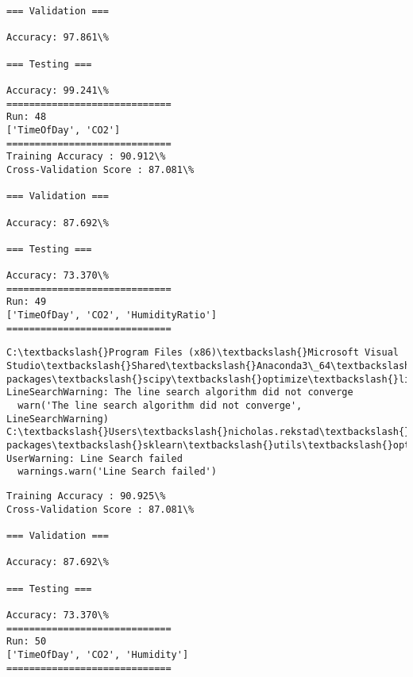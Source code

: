 \documentclass[11pt]{article}
\begin{document}
\begin{Verbatim}[commandchars=\\\{\}]
=== Validation ===

Accuracy: 97.861\%

=== Testing ===

Accuracy: 99.241\%
=============================
Run: 48
['TimeOfDay', 'CO2']
=============================
Training Accuracy : 90.912\%
Cross-Validation Score : 87.081\%

=== Validation ===

Accuracy: 87.692\%

=== Testing ===

Accuracy: 73.370\%
=============================
Run: 49
['TimeOfDay', 'CO2', 'HumidityRatio']
=============================

    \end{Verbatim}

    \begin{Verbatim}[commandchars=\\\{\}]
C:\textbackslash{}Program Files (x86)\textbackslash{}Microsoft Visual Studio\textbackslash{}Shared\textbackslash{}Anaconda3\_64\textbackslash{}lib\textbackslash{}site-packages\textbackslash{}scipy\textbackslash{}optimize\textbackslash{}linesearch.py:313: LineSearchWarning: The line search algorithm did not converge
  warn('The line search algorithm did not converge', LineSearchWarning)
C:\textbackslash{}Users\textbackslash{}nicholas.rekstad\textbackslash{}AppData\textbackslash{}Roaming\textbackslash{}Python\textbackslash{}Python36\textbackslash{}site-packages\textbackslash{}sklearn\textbackslash{}utils\textbackslash{}optimize.py:195: UserWarning: Line Search failed
  warnings.warn('Line Search failed')

    \end{Verbatim}

    \begin{Verbatim}[commandchars=\\\{\}]
Training Accuracy : 90.925\%
Cross-Validation Score : 87.081\%

=== Validation ===

Accuracy: 87.692\%

=== Testing ===

Accuracy: 73.370\%
=============================
Run: 50
['TimeOfDay', 'CO2', 'Humidity']
=============================

    \end{Verbatim}
\end{document}
